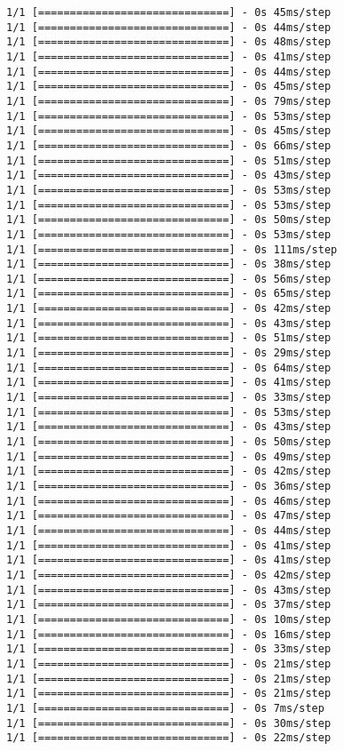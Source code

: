 \documentclass[11pt]{article}
\begin{document}
\begin{Verbatim}[commandchars=\\\{\}]
1/1 [==============================] - 0s 45ms/step
1/1 [==============================] - 0s 44ms/step
1/1 [==============================] - 0s 48ms/step
1/1 [==============================] - 0s 41ms/step
1/1 [==============================] - 0s 44ms/step
1/1 [==============================] - 0s 45ms/step
1/1 [==============================] - 0s 79ms/step
1/1 [==============================] - 0s 53ms/step
1/1 [==============================] - 0s 45ms/step
1/1 [==============================] - 0s 66ms/step
1/1 [==============================] - 0s 51ms/step
1/1 [==============================] - 0s 43ms/step
1/1 [==============================] - 0s 53ms/step
1/1 [==============================] - 0s 53ms/step
1/1 [==============================] - 0s 50ms/step
1/1 [==============================] - 0s 53ms/step
1/1 [==============================] - 0s 111ms/step
1/1 [==============================] - 0s 38ms/step
1/1 [==============================] - 0s 56ms/step
1/1 [==============================] - 0s 65ms/step
1/1 [==============================] - 0s 42ms/step
1/1 [==============================] - 0s 43ms/step
1/1 [==============================] - 0s 51ms/step
1/1 [==============================] - 0s 29ms/step
1/1 [==============================] - 0s 64ms/step
1/1 [==============================] - 0s 41ms/step
1/1 [==============================] - 0s 33ms/step
1/1 [==============================] - 0s 53ms/step
1/1 [==============================] - 0s 43ms/step
1/1 [==============================] - 0s 50ms/step
1/1 [==============================] - 0s 49ms/step
1/1 [==============================] - 0s 42ms/step
1/1 [==============================] - 0s 36ms/step
1/1 [==============================] - 0s 46ms/step
1/1 [==============================] - 0s 47ms/step
1/1 [==============================] - 0s 44ms/step
1/1 [==============================] - 0s 41ms/step
1/1 [==============================] - 0s 41ms/step
1/1 [==============================] - 0s 42ms/step
1/1 [==============================] - 0s 43ms/step
1/1 [==============================] - 0s 37ms/step
1/1 [==============================] - 0s 10ms/step
1/1 [==============================] - 0s 16ms/step
1/1 [==============================] - 0s 33ms/step
1/1 [==============================] - 0s 21ms/step
1/1 [==============================] - 0s 21ms/step
1/1 [==============================] - 0s 21ms/step
1/1 [==============================] - 0s 7ms/step
1/1 [==============================] - 0s 30ms/step
1/1 [==============================] - 0s 22ms/step

\end{Verbatim}
\end{document}
